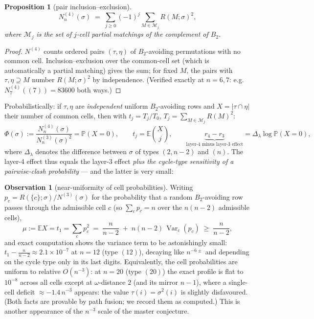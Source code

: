 \documentclass[11pt]{article}
\newtheorem{proposition}[theorem]{Proposition}
\theoremstyle{definition}
\newtheorem{observation}[theorem]{Observation}
\newcommand{\E}{\mathbb{E}}
\renewcommand{\Pr}{\mathbb{P}}
\begin{document}
\begin{proposition}[pair inclusion--exclusion]\label{prop:pairIE}
\[
N^{(4)}_n(\sigma)\;=\;\sum_{j\ge0}(-1)^j\!\!\sum_{M\in\mathcal M_j}
R(M;\sigma)^2 ,
\]
where $\mathcal M_j$ is the set of $j$-cell partial matchings of the
complement of $B_2$.
\end{proposition}

\begin{proof}
$N^{(4)}$ counts ordered pairs $(\tau,\eta)$ of $B_2$-avoiding permutations
with no common cell.  Inclusion--exclusion over the common-cell set (which
is automatically a partial matching) gives the sum; for fixed $M$, the pairs
with $\tau,\eta\supseteq M$ number $R(M;\sigma)^2$ by independence.
(Verified exactly at $n=6,7$: e.g.\ $N^{(4)}_7((7))=83600$ both ways.)
\end{proof}

Probabilistically: if $\tau,\eta$ are \emph{independent} uniform
$B_2$-avoiding rows and $X=|\tau\cap\eta|$ their number of common cells,
then with $t_j=T_j/T_0$, $T_j=\sum_{M\in\mathcal M_j}R(M)^2$:
\[
\Phi(\sigma):=\frac{N^{(4)}_n(\sigma)}{N^{(3)}_n(\sigma)^2}
=\Pr(X=0),\qquad t_j=\E\binom Xj,
\qquad
\underbrace{r_4-r_3}_{\text{layer-4 minus layer-3 effect}}=\Delta_\lambda\log\Pr(X=0),
\]
where $\Delta_\lambda$ denotes the difference between $\sigma$ of types
$(2,n-2)$ and $(n)$.  The layer-4 effect thus equals the layer-3 effect
\emph{plus the cycle-type sensitivity of a pairwise-clash probability} ---
and the latter is very small:

\begin{observation}[near-uniformity of cell probabilities]\label{obs:cells}
Writing $p_c=R(\{c\};\sigma)/N^{(3)}(\sigma)$ for the probability that a
random $B_2$-avoiding row passes through the admissible cell $c$
(so $\sum_cp_c=n$ over the $n(n-2)$ admissible cells),
\[
\mu:=\E X=t_1=\sum_cp_c^2\;=\;\frac n{n-2}\;+\;n(n-2)\,
\operatorname{Var}_c(p_c)\;\ge\;\frac n{n-2},
\]
and exact computation shows the variance term to be astonishingly small:
$t_1-\tfrac n{n-2}\approx 2.1\times10^{-7}$ at $n=12$ (type $(12)$),
decaying like $n^{-6\pm}$ and depending on the cycle type only in its last
digits.  Equivalently, the cell probabilities are uniform to relative
$O(n^{-3})$: at $n=20$ (type $(20)$) the exact profile is flat to
$10^{-8}$ across all cells except at $\omega$-distance $2$ (and its mirror
$n-1$), where a single-cell deficit $\approx-1.4\,n^{-3}$ appears: the value
$\tau(i)=\sigma^2(i)$ is slightly disfavoured.  (Both facts are provable by
path fusion; we record them as computed.)  This is another appearance of the
$n^{-3}$ scale of the master conjecture.
\end{observation}
\end{document}
